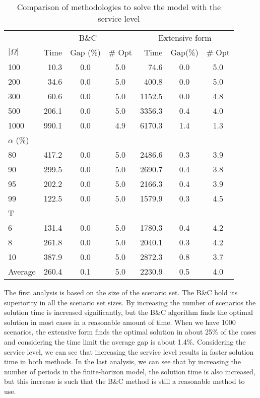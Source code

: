 \documentclass[11pt]{article}
\newcommand{\Ti}{T}
\newcommand{\Em}{|\Omega|} %
\begin{document}
\begin{table}[H]
\centering
\caption{Comparison of methodologies to solve the model with the service level}
\label{tab:MethodologyCompare}
\begin{tabular}{lrccrcc}
\toprule
  & \multicolumn{3}{c}{ B\&C} &  \multicolumn{3}{c}{Extensive form}
  \\
\cmidrule(lr){1-1}
\cmidrule(lr){2-4}
\cmidrule(lr){5-7}
$\Em$ & Time       & Gap (\%)       & \# Opt      & Time    & Gap(\%)     & \# Opt   \\
\midrule
100	&	10.3	&	0.0	&	5.0	&	74.6	&	0.0	&	5.0	\\
200	&	34.6	&	0.0	&	5.0	&	400.8	&	0.0	&	5.0	\\
300	&	60.6	&	0.0	&	5.0	&		1152.5	&	0.0	&	4.8	\\
500	&	206.1	&	0.0	&	5.0	&	3356.3	&	0.4	&	4.0	\\
1000	&	990.1	&	0.0	&	4.9	&	6170.3	&	1.4	&	1.3	\\
\midrule
$\alpha$ (\%) &&&&&&\\
80&	417.2	&	0.0	&	5.0	&		2486.6	&	0.3	&	3.9	\\
90&	299.5	&	0.0	&	5.0	&	2690.7	&	0.4	&	3.8	\\
95&	202.2	&	0.0	&	5.0	&	2166.3	&	0.4	&	3.9	\\
99&	122.5	&	0.0	&	5.0	&	1579.9	&	0.3	&	4.5	\\
\midrule
\Ti &&&&&&\\
6	&	131.4	&	0.0	&	5.0	&		1780.3	&	0.4	&	4.2	\\
8	&	261.8	&	0.0	&	5.0	&	2040.1	&	0.3	&	4.2	\\
10	&	387.9	&	0.0	&	5.0	&		2872.3	&	0.8	&	3.7	\\
\midrule
Average &	260.4	&	0.1	&	5.0	&		2230.9	&	0.5	&	4.0	\\
\bottomrule
\end{tabular}

\end{table}

The first analysis is based on the size of the scenario set. The B\&C hold its superiority in all the scenario set sizes. By increasing the number of scenarios the solution time is increased significantly, but the B\&C algorithm finds the optimal solution in most cases in a reasonable amount of time. When we have 1000 scenarios, the extensive form finds the optimal solution in about 25\% of the cases and considering the time limit the average gap is about 1.4\%. Considering the service level, we can see that increasing the service level results in faster solution time in both methods. In the last analysis, we can see that by increasing the number of periods in the finite-horizon model, the solution time is also increased, but this increase is such that the B\&C method is still a reasonable method to use.
\end{document}
